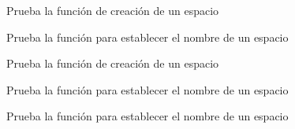 
\begin{DoxyRefList}
\item[\label{test__test000001}%
\hypertarget{test__test000001}{}%
Member \hyperlink{space__test_8h_a69278cc022dc5688d4725f8d36317b30}{test1\+\_\+space\+\_\+create} ()]Prueba la función de creación de un espacio  
\item[\label{test__test000003}%
\hypertarget{test__test000003}{}%
Member \hyperlink{space__test_8h_a2569bab6cfeec15f722d232bb8c78c9e}{test1\+\_\+space\+\_\+set\+\_\+name} ()]Prueba la función para establecer el nombre de un espacio  
\item[\label{test__test000002}%
\hypertarget{test__test000002}{}%
Member \hyperlink{space__test_8h_a012cd3cf37a8d91e2d7098a264c29d65}{test2\+\_\+space\+\_\+create} ()]Prueba la función de creación de un espacio  
\item[\label{test__test000004}%
\hypertarget{test__test000004}{}%
Member \hyperlink{space__test_8h_a5a868ba017602ba6b58447cb394e81a6}{test2\+\_\+space\+\_\+set\+\_\+name} ()]Prueba la función para establecer el nombre de un espacio  
\item[\label{test__test000005}%
\hypertarget{test__test000005}{}%
Member \hyperlink{space__test_8h_aa24a337830006e33706ab6ac1c416b47}{test3\+\_\+space\+\_\+set\+\_\+name} ()]Prueba la función para establecer el nombre de un espacio 
\end{DoxyRefList}